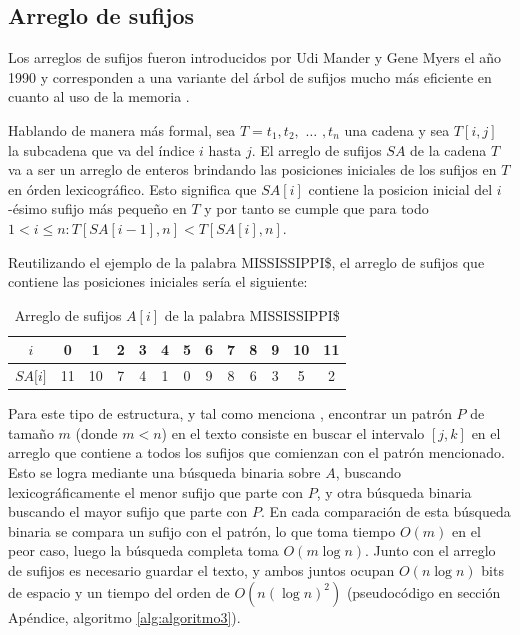\subsection{Arreglo de sufijos}

Los arreglos de sufijos fueron introducidos por Udi Mander y Gene Myers el año 1990 \cite{suffixarray1} y corresponden a una variante del árbol de sufijos mucho más eficiente en cuanto al uso de la memoria \cite{licenciado}. 

Hablando de manera más formal, sea $T=t_{1}, t_{2},$ $\ldots$ $,t_{n}$ una cadena y sea $T[i,j]$ la subcadena que va del índice $i$ hasta $j$. El arreglo de sufijos $SA$ de la cadena $T$ va a ser un arreglo de enteros brindando las posiciones iniciales de los sufijos en $T$ en órden lexicográfico. Esto significa que $SA[i]$ contiene la posicion inicial del $i$-ésimo sufijo más pequeño en $T$ y por tanto se cumple que para todo $1 < i \leq n: T[SA[i-1],n] < T[SA[i],n]$. 

Reutilizando el ejemplo de la palabra MISSISSIPPI\$, el arreglo de sufijos que contiene las posiciones iniciales sería el siguiente:

\begin{table}[h]
\centering
\label{my-label9}
\begin{tabular}{|
>{\columncolor[HTML]{EFEFEF}}c|c|c|c|c|c|c|c|c|c|c|c|c|}
\hline
$i$        & 0  & 1  & 2 & 3 & 4 & 5 & 6 & 7 & 8 & 9 & 10 & 11 \\ \hline
$SA{[}i{]}$ & 11 & 10 & 7 & 4 & 1 & 0 & 9 & 8 & 6 & 3 & 5  & 2  \\ \hline
\end{tabular}
\caption{Arreglo de sufijos $A[i]$ de la palabra MISSISSIPPI\$}
\end{table} 

Para este tipo de estructura, y tal como menciona \cite{abeliuk}, encontrar un patrón $P$ de tamaño $m$ (donde $m < n$) en el texto consiste en buscar el intervalo $[j,k]$ en el arreglo que contiene a todos los sufijos que comienzan con el patrón mencionado. Esto se logra mediante una búsqueda binaria sobre $A$, buscando lexicográficamente el menor sufijo que parte con $P$, y otra búsqueda binaria buscando el mayor sufijo que parte con $P$. En cada comparación de esta búsqueda binaria se compara un sufijo con el patrón, lo que toma tiempo $O(m)$ en el peor caso, luego la búsqueda completa toma $O(m \log n)$. Junto con el arreglo de sufijos es necesario guardar el texto, y ambos juntos ocupan $O(n \log n)$ bits de espacio y un tiempo del orden de $O(n (\log n)^{2})$ \cite{suffixarray2} (pseudocódigo en sección Apéndice, algoritmo \ref{alg:algoritmo3}).

